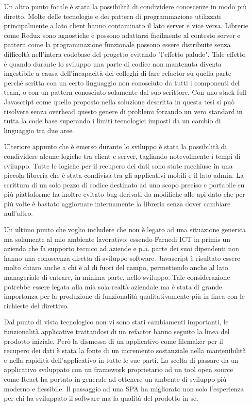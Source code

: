 \vspace{5mm}Un altro punto focale è stata la possibilità di condividere conoscenze in modo più diretto. Molte delle tecnologie e dei pattern di programmazione utilizzati principalmente a lato client hanno contaminato il lato server e vice versa. Librerie come Redux sono agnostiche e possono adattarsi facilmente al contesto server e pattern come la programmazione funzionale possono essere distribuite senza difficoltà nell'intera codebase del progetto evitando "l'effetto palude". Tale effetto è quando durante lo sviluppo una parte di codice non mantenuta diventa ingestibile a causa dell'incapacità dei colleghi di fare refactor su quella parte perché scritta con un certo linguaggio non conosciuto da tutti i componenti del team, o con un pattern conosciuto solamente dal suo scrittore. Con uno stack full Javascript come quello proposto nella soluzione descritta in questa tesi si può risolvere senza overhead questo genere di problemi forzando un vero standard in tutta la code base superando i limiti tecnologici imposti da un cambio di linguaggio tra due aree.

\vspace{5mm}Ulteriore appunto che è emerso durante lo sviluppo è stata la possibilità di condividere alcune logiche tra client e server, tagliando notevolmente i tempi di sviluppo. Tutte le logiche per il recupero dei dati sono state racchiuse in una piccola libreria che è stata condivisa tra gli applicativi mobili e il lato admin. La scrittura di un solo pezzo di codice destinato ad uno scopo preciso e portabile su più piattaforme ha inoltre evitato bug derivati da modifiche alle api dato che per più volte è bastato aggiornare internamente la libreria senza dover cambiare null'altro.

\vspace{5mm}Un ultimo punto che voglio includere che non è legato ad una situazione generica ma solamente al mio ambiente lavorativo; essendo Farnedi ICT in primis un azienda che fa supporto tecnico ad aziende e p.a. parte dei suoi dipendenti non hanno una conoscenza diretta di sviluppo software. Javascript è risultato essere molto chiaro anche a chi è al di fuori del campo, permettendo anche al lato manageriale di entrare, in minima parte, nello sviluppo. Tale considerazione potrebbe essere legata alla mia sola realtà aziendale ma è stata di grande importanza per la produzione di funzionalità qualitativamente più in linea con le richieste del direttivo.

\vspace{5mm}Dal punto di vista tecnologico non vi sono stati cambiamenti importanti, le funzionalità applicative trattandosi di un refactor hanno seguito la linea del prodotto iniziale. Però la dismessa di un applicativo come filemaker per il recupero dei dati è stata la fonte di un incremento sostanziale nella mantenibilità e nella rapidità dell'applicativo in tutte le sue parti. La scelta di passare da un applicativo sviluppato con un framework proprietario ad un tool open source come React ha portato in generale ad ottenere un ambente di sviluppo più moderno e flessibile. Il passaggio ad una SPA\cite{SPA} ha migliorato non solo l'esperienza per chi ha sviluppato il software ma la qualità del prodotto in se.


